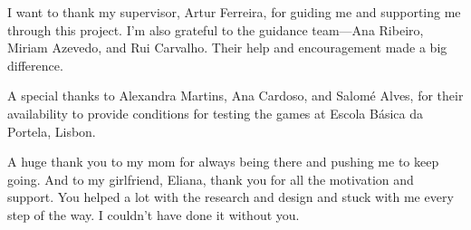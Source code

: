 \acknowledgements

I want to thank my supervisor, Artur Ferreira, for guiding me and supporting me through this project. I’m also grateful to the guidance team—Ana Ribeiro, Miriam Azevedo, and Rui Carvalho. Their help and encouragement made a big difference.

A special thanks to Alexandra Martins, Ana Cardoso, and Salomé Alves, for their availability to provide conditions for testing the games at Escola Básica da Portela, Lisbon.

A huge thank you to my mom for always being there and pushing me to keep going. And to my girlfriend, Eliana, thank you for all the motivation and support. You helped a lot with the research and design and stuck with me every step of the way. I couldn’t have done it without you.